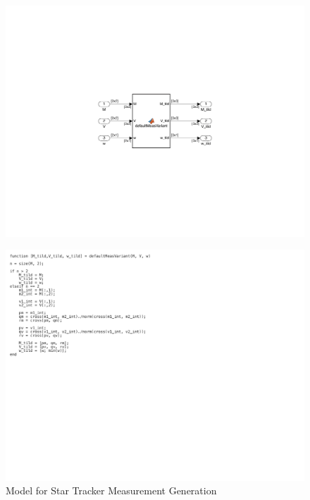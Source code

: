 \begin{figure}[H]
    \centering
    \includegraphics[trim={8cm 5cm 8cm 7cm},clip,width = 12cm]{Images/PS6/feedthrough_meas.png}
\end{figure}

\begin{figure}[H]
    \centering
    \captionsetup{ justification = centering }
    \includegraphics[trim={0cm 10cm 10cm 0cm},clip,width = 15cm]{Images/PS6/feedthrough_meas_code.png}
    \caption{Model for Star Tracker Measurement Generation}
    \label{fig:feedthrough_meas}
\end{figure}

